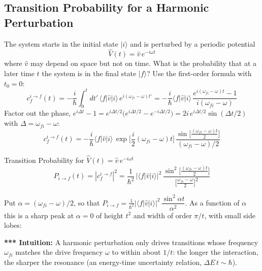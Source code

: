 \documentclass[11pt,a4paper]{article}
\begin{document}
\subsection{Transition Probability for a Harmonic Perturbation}
The system starts in the initial state $|i\rangle$ and is perturbed by a periodic potential
\[
\hat V(t)=\hat v\,e^{-i\omega t}
\]
where $\hat v$ may depend on space but not on time. What is the probability that at a later time $t$ the system is in the final state $|f\rangle$? Use the first-order formula with $t_0=0$:
\[
c_f^{i\to f}(t) = -\frac i\hbar\int_0^tdt'\,\langle f|\hat v|i\rangle\,e^{i(\omega_{fi}-\omega)t'}
= -\frac i\hbar\langle f|\hat v|i\rangle\,\frac{e^{i(\omega_{fi}-\omega)t}-1}{i(\omega_{fi}-\omega)}
\]
Factor out the phase, $e^{i\Delta t}-1=e^{i\Delta t/2}\big(e^{i\Delta t/2}-e^{-i\Delta t/2}\big)=2i\,e^{i\Delta t/2}\sin(\Delta t/2)$ with $\Delta=\omega_{fi}-\omega$:
\[
c_f^{i\to f}(t) = -\frac i\hbar\langle f|\hat v|i\rangle\,\exp\Big[\frac i2(\omega_{fi}-\omega)t\Big]\,
\frac{\sin\!\big[\frac{(\omega_{fi}-\omega)t}2\big]}{(\omega_{fi}-\omega)/2}
\]
\begin{thm}{Transition Probability for $\hat V(t)=\hat v\,e^{-i\omega t}$}
\[
P_{i\to f}(t) = |c_f^{i\to f}|^2 = \frac1{\hbar^2}\,|\langle f|\hat v|i\rangle|^2\,
\frac{\sin^2\!\big[\frac{(\omega_{fi}-\omega)t}2\big]}{\big[\frac{\omega_{fi}-\omega}2\big]^2}
\]
\end{thm}
Put $\alpha=(\omega_{fi}-\omega)/2$, so that $P_{i\to f}=\frac1{\hbar^2}|\langle f|\hat v|i\rangle|^2\,\dfrac{\sin^2\alpha t}{\alpha^2}$. As a function of $\alpha$ this is a sharp peak at $\alpha=0$ of height $t^2$ and width of order $\pi/t$, with small side lobes:

\begin{center}
\end{center}

\textbf{*** Intuition:} A harmonic perturbation only drives transitions whose frequency $\omega_{fi}$ matches the drive frequency $\omega$ to within about $1/t$: the longer the interaction, the sharper the resonance (an energy-time uncertainty relation, $\Delta E\,t\sim\hbar$).
\end{document}
